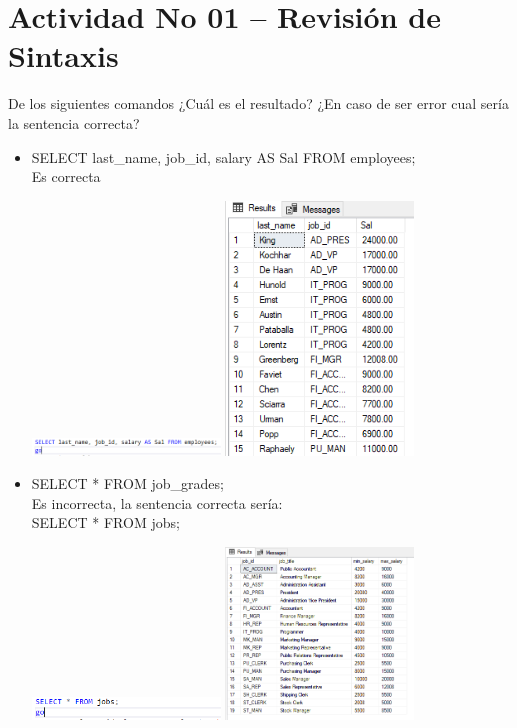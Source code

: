 \section{Actividad No 01 – Revisi\'on de Sintaxis} 
De los siguientes comandos ¿Cuál es el resultado? ¿En caso de ser error cual sería la sentencia correcta?

\begin{itemize}
	\item SELECT last\_name, job\_id, salary AS Sal FROM employees;
	\\Es correcta
	\begin{center}
	\includegraphics[width=5cm]{./Imagenes/actividad_01_01a} 
	\includegraphics[width=5cm]{./Imagenes/actividad_01_01} 
	\end{center}

	\item SELECT * FROM job\_grades;
	\\Es incorrecta, la sentencia correcta sería:
	\\SELECT * FROM jobs;
	\begin{center}
	\includegraphics[width=5cm]{./Imagenes/actividad_01_02a} 
	\includegraphics[width=5cm]{./Imagenes/actividad_01_02} 
	\end{center}
	

\end{itemize}
